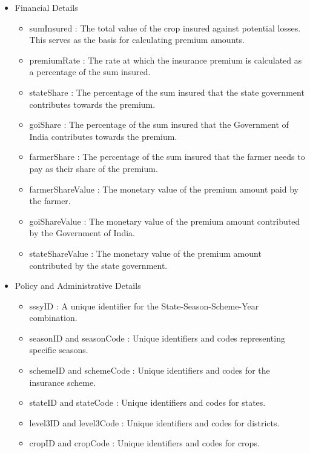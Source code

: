 \documentclass[12pt]{article}
\begin{document}
\begin{itemize}
\item {Financial Details}
\begin{itemize}
\item{sumInsured : The total value of the crop insured against potential losses. This serves as the basis for calculating premium amounts.}
\item{premiumRate : The rate at which the insurance premium is calculated as a percentage of the sum insured.}
\item{stateShare : The percentage of the sum insured that the state government contributes towards the premium.}
\item{goiShare : The percentage of the sum insured that the Government of India contributes towards the premium.}
\item{farmerShare : The percentage of the sum insured that the farmer needs to pay as their share of the premium.}
\item{farmerShareValue : The monetary value of the premium amount paid by the farmer.}
\item{goiShareValue : The monetary value of the premium amount contributed by the Government of India.}
\item{stateShareValue : The monetary value of the premium amount contributed by the state government.}
\end{itemize}
\end{itemize}

\begin{itemize}
\item {Policy and Administrative Details}
\begin{itemize}
\item{sssyID : A unique identifier for the State-Season-Scheme-Year combination.}
\item{seasonID and seasonCode : Unique identifiers and codes representing specific seasons.}
\item{schemeID and schemeCode : Unique identifiers and codes for the insurance scheme.}
\item{stateID and stateCode : Unique identifiers and codes for states.}
\item{level3ID and level3Code : Unique identifiers and codes for districts.}
\item{cropID and cropCode : Unique identifiers and codes for crops.}
\end{itemize}
\end{itemize}
\end{document}

